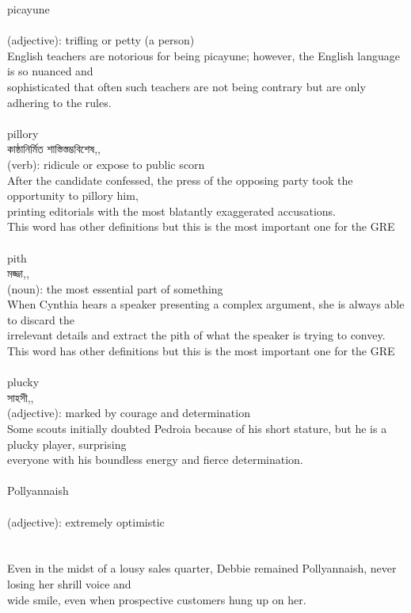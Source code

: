 \documentclass{article}
\begin{document}
{{picayune}\\
{}\\
{(adjective): trifling or petty (a person)\\English teachers are notorious for being picayune; however, the English language is so nuanced and\\sophisticated that often such teachers are not being contrary but are only adhering to the rules.\\}\\
{pillory}\\
{কাষ্ঠানির্মিত শাস্তিস্তম্ভবিশেষ,,}\\
{(verb): ridicule or expose to public scorn\\After the candidate confessed, the press of the opposing party took the opportunity to pillory him,\\printing editorials with the most blatantly exaggerated accusations.\\This word has other definitions but this is the most important one for the GRE\\}\\
{pith}\\
{মজ্জা,,}\\
{(noun): the most essential part of something\\When Cynthia hears a speaker presenting a complex argument, she is always able to discard the\\irrelevant details and extract the pith of what the speaker is trying to convey.\\This word has other definitions but this is the most important one for the GRE\\}\\
{plucky}\\
{সাহসী,,}\\
{(adjective): marked by courage and determination\\Some scouts initially doubted Pedroia because of his short stature, but he is a plucky player, surprising\\everyone with his boundless energy and fierce determination.\\}\\
{Pollyannaish}\\
{}\\
{(adjective): extremely optimistic\\\\                                                                                \\Even in the midst of a lousy sales quarter, Debbie remained Pollyannaish, never losing her shrill voice and\\wide smile, even when prospective customers hung up on her.\\}\\
}
\end{document}
